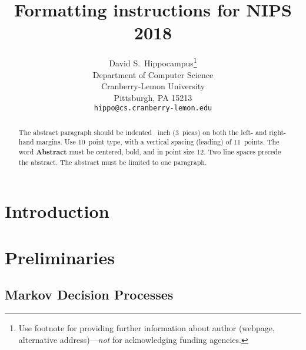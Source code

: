 \documentclass{article}
\title{Formatting instructions for NIPS 2018}
\author{
  David S.~Hippocampus\thanks{Use footnote for providing further
    information about author (webpage, alternative
    address)---\emph{not} for acknowledging funding agencies.} \\
  Department of Computer Science\\
  Cranberry-Lemon University\\
  Pittsburgh, PA 15213 \\
  \texttt{hippo@cs.cranberry-lemon.edu} \\
}
\begin{document}

\maketitle

\begin{abstract}
  The abstract paragraph should be indented ~inch
  (3~picas) on both the left- and right-hand margins. Use 10~point
  type, with a vertical spacing (leading) of 11~points.  The word
  \textbf{Abstract} must be centered, bold, and in point size 12. Two
  line spaces precede the abstract. The abstract must be limited to
  one paragraph.
\end{abstract}

\section{Introduction}

\section{Preliminaries}

\subsection{Markov Decision Processes}
\end{document}
